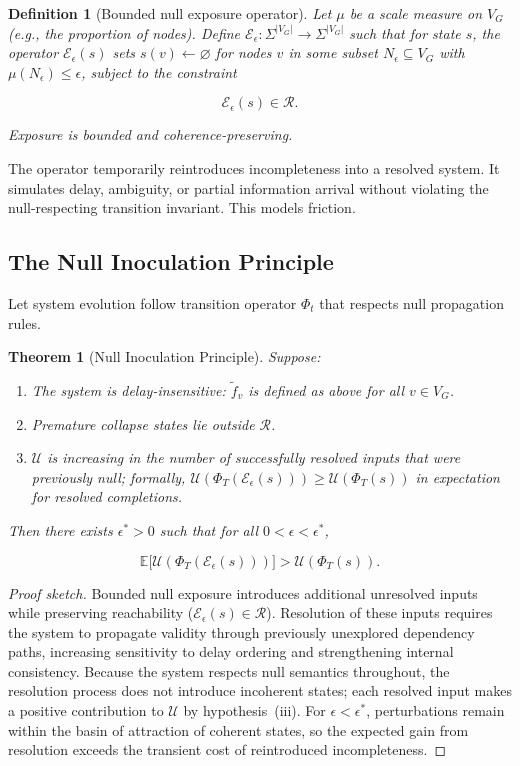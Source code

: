 \documentclass[11pt]{article}
\newtheorem{theorem}{Theorem}
\newtheorem{definition}{Definition}
\theoremstyle{remark}
\begin{document}
\begin{definition}[Bounded null exposure operator]
Let $\mu$ be a scale measure on $V_G$ (e.g., the proportion of nodes). Define $\mathcal{E}_\epsilon : \Sigma^{|V_G|} \to \Sigma^{|V_G|}$ such that for state $s$, the operator $\mathcal{E}_\epsilon(s)$ sets $s(v) \leftarrow \varnothing$ for nodes $v$ in some subset $N_\epsilon \subseteq V_G$ with $\mu(N_\epsilon) \leq \epsilon$, subject to the constraint

\[
\mathcal{E}_\epsilon(s) \in \mathcal{R}.
\]

Exposure is bounded and coherence-preserving.
\end{definition}

The operator temporarily reintroduces incompleteness into a resolved system. It simulates delay, ambiguity, or partial information arrival without violating the null-respecting transition invariant. This models friction.

\subsection{The Null Inoculation Principle}

Let system evolution follow transition operator $\Phi_t$ that respects null propagation rules.

\begin{theorem}[Null Inoculation Principle]
\label{thm:nip}
Suppose:
\begin{enumerate}[label=(\roman*)]
  \item The system is delay-insensitive: $\tilde{f}_v$ is defined as above for all $v \in V_G$.
  \item Premature collapse states lie outside $\mathcal{R}$.
  \item $\mathcal{U}$ is increasing in the number of successfully resolved inputs that were previously null; formally, $\mathcal{U}(\Phi_T(\mathcal{E}_\epsilon(s))) \geq \mathcal{U}(\Phi_T(s))$ in expectation for resolved completions.
\end{enumerate}
Then there exists $\epsilon^* > 0$ such that for all $0 < \epsilon < \epsilon^*$,

\[
\mathbb{E}\bigl[\mathcal{U}(\Phi_T(\mathcal{E}_\epsilon(s)))\bigr] > \mathcal{U}(\Phi_T(s)).
\]
\end{theorem}

\begin{proof}[Proof sketch]
Bounded null exposure introduces additional unresolved inputs while preserving reachability ($\mathcal{E}_\epsilon(s) \in \mathcal{R}$). Resolution of these inputs requires the system to propagate validity through previously unexplored dependency paths, increasing sensitivity to delay ordering and strengthening internal consistency. Because the system respects null semantics throughout, the resolution process does not introduce incoherent states; each resolved input makes a positive contribution to $\mathcal{U}$ by hypothesis~(iii). For $\epsilon < \epsilon^*$, perturbations remain within the basin of attraction of coherent states, so the expected gain from resolution exceeds the transient cost of reintroduced incompleteness.
\end{proof}
\end{document}
